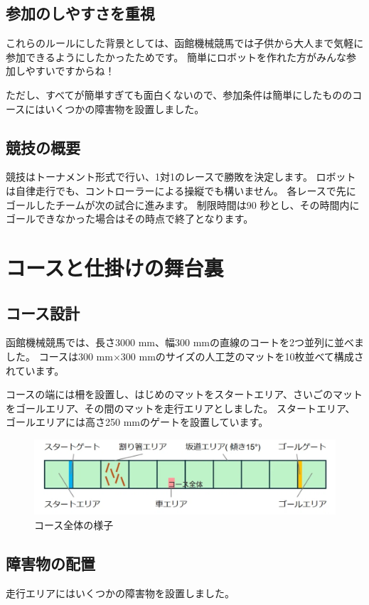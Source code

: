 \section{参加のしやすさを重視}
これらのルールにした背景としては、函館機械競馬では子供から大人まで気軽に参加できるようにしたかったためです。  
簡単にロボットを作れた方がみんな参加しやすいですからね！

ただし、すべてが簡単すぎても面白くないので、参加条件は簡単にしたもののコースにはいくつかの障害物を設置しました。

\section{競技の概要}
競技はトーナメント形式で行い、1対1のレースで勝敗を決定します。  
ロボットは自律走行でも、コントローラーによる操縦でも構いません。  
各レースで先にゴールしたチームが次の試合に進みます。  
制限時間は90 秒とし、その時間内にゴールできなかった場合はその時点で終了となります。

\chapter{コースと仕掛けの舞台裏}
\section{コース設計}
函館機械競馬では、長さ3000 mm、幅300 mmの直線のコートを2つ並列に並べました。  
コースは300 mm×300 mmのサイズの人工芝のマットを10枚並べて構成されています。

コースの端には柵を設置し、はじめのマットをスタートエリア、さいごのマットをゴールエリア、その間のマットを走行エリアとしました。  
スタートエリア、ゴールエリアには高さ250 mmのゲートを設置しています。

\begin{figure}[h]
\centering
\includegraphics[width=0.7\linewidth]{pages/images/course-layout.png}
\caption{コース全体の様子}
\end{figure}

\section{障害物の配置}
走行エリアにはいくつかの障害物を設置しました。

